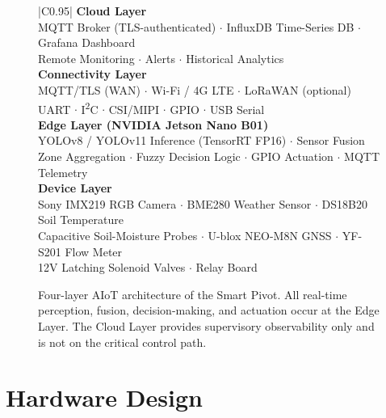 \documentclass[12pt,a4paper]{report}
\begin{document}
\begin{figure}[H]
\centering
\begin{tcolorbox}[width=0.92\textwidth, colback=blue!3, colframe=blue!60!black,
    arc=4mm, title={\textbf{Smart Pivot AIoT Architecture (Four-Layer Model)}},
    fonttitle=\bfseries\normalsize]
\small
\begin{center}
\begin{tabular}{|C{0.95\textwidth}|}
\hline
{}
\textbf{Cloud Layer} \\
MQTT Broker (TLS-authenticated) $\cdot$ InfluxDB Time-Series DB $\cdot$ Grafana Dashboard \\
Remote Monitoring $\cdot$ Alerts $\cdot$ Historical Analytics \\
\hline
{}
\textbf{Connectivity Layer} \\
MQTT/TLS (WAN) $\cdot$ Wi-Fi / 4G LTE $\cdot$ LoRaWAN (optional) \\
UART $\cdot$ I\textsuperscript{2}C $\cdot$ CSI/MIPI $\cdot$ GPIO $\cdot$ USB Serial \\
\hline
{}
\textbf{Edge Layer (NVIDIA Jetson Nano B01)} \\
YOLOv8 / YOLOv11 Inference (TensorRT FP16) $\cdot$ Sensor Fusion \\
Zone Aggregation $\cdot$ Fuzzy Decision Logic $\cdot$ GPIO Actuation $\cdot$ MQTT Telemetry \\
\hline
{}
\textbf{Device Layer} \\
Sony IMX219 RGB Camera $\cdot$ BME280 Weather Sensor $\cdot$ DS18B20 Soil Temperature \\
Capacitive Soil-Moisture Probes $\cdot$ U-blox NEO-M8N GNSS $\cdot$ YF-S201 Flow Meter \\
12V Latching Solenoid Valves $\cdot$ Relay Board \\
\hline
\end{tabular}
\end{center}
\end{tcolorbox}
\caption{Four-layer AIoT architecture of the Smart Pivot. All real-time perception, fusion, decision-making, and actuation occur at the Edge Layer. The Cloud Layer provides supervisory observability only and is not on the critical control path.}
\label{fig:arch}
\end{figure}

\section{Hardware Design}
\end{document}
